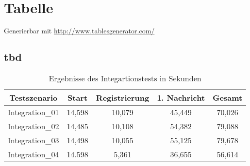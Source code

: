 
\chapter{Tabelle}

Generierbar mit \url{http://www.tablesgenerator.com/}

\section{tbd} 

\begin{table}[h]
\centering
\caption{Ergebnisse des Integartionstests in Sekunden}
\label{tab:integration}
\begin{tabular}{@{}ccccc@{}}
\toprule
Testszenario    & Start  & Registrierung & 1. Nachricht & \textbf{Gesamt} \\ \midrule
Integration\_01 & 14,598 & 10,079        & 45,449       & 70,026        \\
Integration\_02 & 14,485 & 10,108        & 54,382       & 79,088        \\
Integration\_03 & 14,498 & 10,055        & 55,125       & 79,678        \\
Integration\_04 & 14.598 & 5,361         & 36,655       & 56,614          \\ \bottomrule
\end{tabular}
\end{table}